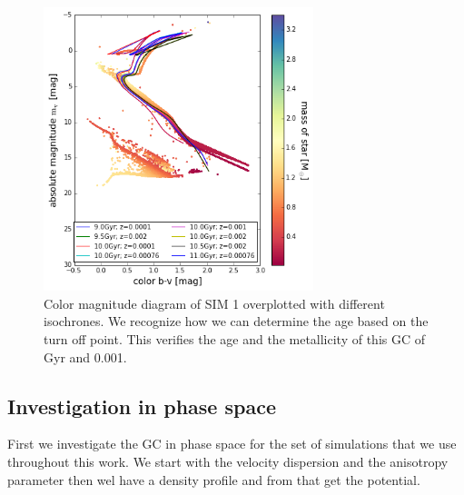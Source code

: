 \begin{figure}[htbp]
\centering
\includegraphics[width=0.7\textwidth]{Plots/cmd_isochrones.png}
\caption{Color magnitude diagram of SIM 1 overplotted with different isochrones. We recognize how we can determine the age based on the turn off point. This verifies the age and the metallicity of this \ac{GC} of \unit[10]{Gyr} and 0.001.}
	\label{fig:cmd_isochrones}
\end{figure}



\subsection{Investigation in phase space}\label{sec:phase_space}

First we investigate the \ac{GC} in phase space for the set of simulations that we use throughout this work. We start with the velocity dispersion and the anisotropy parameter then wel have a density profile and from that get the potential. 

